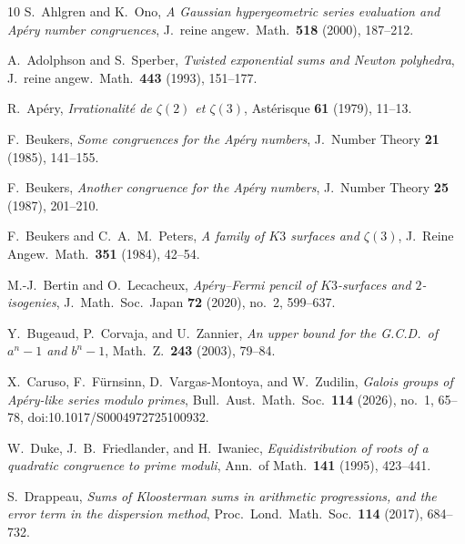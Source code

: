 \documentclass[11pt]{article}
\theoremstyle{definition}
\theoremstyle{remark}
\begin{document}






\begin{thebibliography}{10}
S.~Ahlgren and K.~Ono,
\emph{A Gaussian hypergeometric series evaluation and
Ap\'ery number congruences},
J.~reine angew.\ Math.\ \textbf{518} (2000), 187--212.

A.~Adolphson and S.~Sperber,
\emph{Twisted exponential sums and Newton polyhedra},
J.~reine angew.\ Math.\ \textbf{443} (1993), 151--177.

R.~Ap\'ery,
\emph{Irrationalit\'e de $\zeta(2)$ et $\zeta(3)$},
Ast\'erisque \textbf{61} (1979), 11--13.

F.~Beukers,
\emph{Some congruences for the Ap\'ery numbers},
J.~Number Theory \textbf{21} (1985), 141--155.

F.~Beukers,
\emph{Another congruence for the Ap\'ery numbers},
J.~Number Theory \textbf{25} (1987), 201--210.

F.~Beukers and C.~A.~M.~Peters,
\emph{A family of $K3$ surfaces and $\zeta(3)$},
J.~Reine Angew.~Math.\ \textbf{351} (1984), 42--54.

M.-J.~Bertin and O.~Lecacheux,
\emph{Ap\'ery--Fermi pencil of $K3$-surfaces and $2$-isogenies},
J.~Math.~Soc.~Japan \textbf{72} (2020), no.~2, 599--637.

Y.~Bugeaud, P.~Corvaja, and U.~Zannier,
\emph{An upper bound for the G.C.D.\ of $a^n - 1$ and $b^n - 1$},
Math.\ Z.\ \textbf{243} (2003), 79--84.

X.~Caruso, F.~F\"urnsinn, D.~Vargas-Montoya, and W.~Zudilin,
\emph{Galois groups of Ap\'ery-like series modulo primes},
Bull.~Aust.~Math.~Soc.\ \textbf{114} (2026), no.~1, 65--78,
doi:10.1017/S0004972725100932.

W.~Duke, J.~B.~Friedlander, and H.~Iwaniec,
\emph{Equidistribution of roots of a quadratic congruence
to prime moduli},
Ann.\ of Math.\ \textbf{141} (1995), 423--441.

S.~Drappeau,
\emph{Sums of Kloosterman sums in arithmetic progressions,
and the error term in the dispersion method},
Proc.\ Lond.\ Math.\ Soc.\ \textbf{114} (2017), 684--732.


\end{thebibliography}
\end{document}
